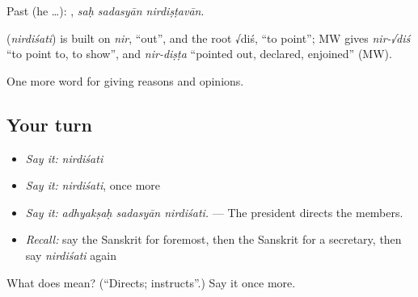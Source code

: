 Past (he …):   , \emph{saḥ sadasyān nirdiṣṭavān}.

\begin{cousinweb}
\textbf{} (\emph{nirdiśati}) is built on \emph{nir}, \textquotedblleft{}out\textquotedblright{}, and the root √diś, \textquotedblleft{}to point\textquotedblright{}; MW gives \emph{nir-√diś} \textquotedblleft{}to point to, to show\textquotedblright{}, and \emph{nir-diṣṭa} \textquotedblleft{}pointed out, declared, enjoined\textquotedblright{} (MW).
\end{cousinweb}

\begin{grammarlens}[title={What you've built}]
One more word for giving reasons and opinions.
\end{grammarlens}

\subsection*{Your turn}
\begin{itemize}
\raggedright
  \item \emph{Say it:} \emph{nirdiśati}
  \item \emph{Say it:} \emph{nirdiśati}, once more
  \item \emph{Say it:} \emph{adhyakṣaḥ sadasyān nirdiśati.} — The president directs the members.
  \item \emph{Recall:} say the Sanskrit for foremost, then the Sanskrit for a secretary, then say \emph{nirdiśati} again
\end{itemize}

\begin{tcolorbox}[breakable,colback=teal!4,colframe=teal!35!black,title={Before you move on}]
What does  mean? (\textquotedblleft{}Directs; instructs\textquotedblright{}.) Say it once more.
\end{tcolorbox}
